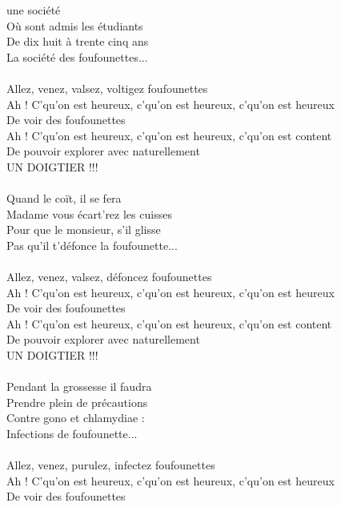 
 une société ~~~~~~~~~~~~ \bissimple
\\Où sont admis les étudiants
\\De dix huit à trente cinq ans ~~~~\bissimple
\\La société des foufounettes...
\\\\Allez, venez, valsez, voltigez foufounettes
\\Ah ! C'qu'on est heureux, c'qu'on est heureux, c'qu'on est heureux
\\De voir des foufounettes
\\Ah ! C'qu'on est heureux, c'qu'on est heureux, c'qu'on est content
\\De pouvoir explorer avec naturellement
\\UN DOIGTIER !!!
\\\\Quand le coït, il se fera ~~~~~~~~~~~~~~~~\bissimple
\\Madame vous écart'rez les cuisses
\\Pour que le monsieur, s'il glisse ~~~~~~~~\bissimple
\\Pas qu'il t'défonce la foufounette...
\\\\Allez, venez, valsez, défoncez foufounettes
\\Ah ! C'qu'on est heureux, c'qu'on est heureux, c'qu'on est heureux
\\De voir des foufounettes
\\Ah ! C'qu'on est heureux, c'qu'on est heureux, c'qu'on est content
\\De pouvoir explorer avec naturellement
\\UN DOIGTIER !!!
\\\\Pendant la grossesse il faudra ~~~\bissimple
\\Prendre plein de précautions
\\Contre gono et chlamydiae :~~~~~~~~ \bissimple
\\Infections de foufounette...
\\\\Allez, venez, purulez, infectez foufounettes
\\Ah ! C'qu'on est heureux, c'qu'on est heureux, c'qu'on est heureux
\\De voir des foufounettes
